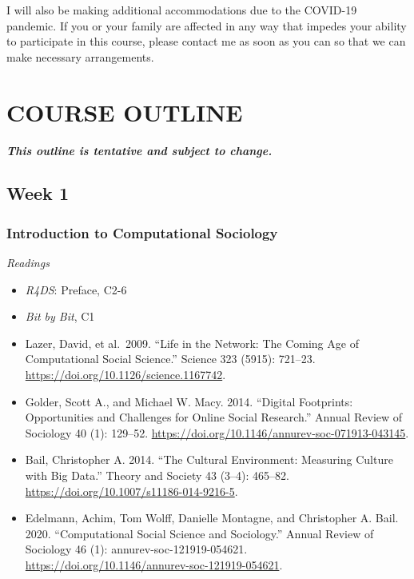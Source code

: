 \documentclass[
  10pt,
]{article}
\providecommand{\tightlist}{%
  \setlength{\itemsep}{0pt}\setlength{\parskip}{0pt}}
\begin{document}
I will also be making additional accommodations due to the COVID-19
pandemic. If you or your family are affected in any way that impedes
your ability to participate in this course, please contact me as soon as
you can so that we can make necessary arrangements.

\hypertarget{course-outline}{%
\section{COURSE OUTLINE}\label{course-outline}}

\textbf{\emph{This outline is tentative and subject to change.}}

\hypertarget{week-1}{%
\subsection{Week 1}\label{week-1}}

\hypertarget{introduction-to-computational-sociology}{%
\subsubsection{Introduction to Computational
Sociology}\label{introduction-to-computational-sociology}}

\emph{Readings}

\begin{itemize}
\tightlist
\item
  \emph{R4DS}: Preface, C2-6
\item
  \emph{Bit by Bit}, C1
\item
  Lazer, David, et al.~2009. ``Life in the Network: The Coming Age of
  Computational Social Science.'' Science 323 (5915): 721--23.
  \url{https://doi.org/10.1126/science.1167742}.
\item
  Golder, Scott A., and Michael W. Macy. 2014. ``Digital Footprints:
  Opportunities and Challenges for Online Social Research.'' Annual
  Review of Sociology 40 (1): 129--52.
  \url{https://doi.org/10.1146/annurev-soc-071913-043145}.
\item
  Bail, Christopher A. 2014. ``The Cultural Environment: Measuring
  Culture with Big Data.'' Theory and Society 43 (3--4): 465--82.
  \url{https://doi.org/10.1007/s11186-014-9216-5}.
\item
  Edelmann, Achim, Tom Wolff, Danielle Montagne, and Christopher A.
  Bail. 2020. ``Computational Social Science and Sociology.'' Annual
  Review of Sociology 46 (1): annurev-soc-121919-054621.
  \url{https://doi.org/10.1146/annurev-soc-121919-054621}.
\end{itemize}
\end{document}
